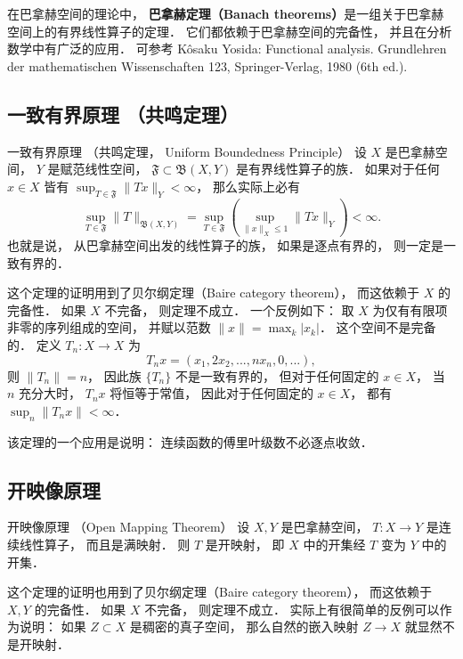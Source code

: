 

在巴拿赫空间的理论中， \textbf{巴拿赫定理（Banach theorems）}是一组关于巴拿赫空间上的有界线性算子的定理． 它们都依赖于巴拿赫空间的完备性， 并且在分析数学中有广泛的应用． 可参考 Kôsaku Yosida: Functional analysis. Grundlehren der mathematischen Wissenschaften 123, Springer-Verlag, 1980 (6th ed.).

\subsection{一致有界原理 （共鸣定理）}
\begin{theorem}{一致有界原理 （共鸣定理， Uniform Boundedness Principle）}
设 $X$ 是巴拿赫空间， $Y$ 是赋范线性空间， $\mathfrak{F}\subset\mathfrak{B}(X,Y)$ 是有界线性算子的族． 如果对于任何 $x\in X$ 皆有 $\sup_{T\in\mathfrak{F}}\|Tx\|_Y<\infty$， 那么实际上必有
$$
\sup_{T\in\mathfrak{F}}\|T\|_{\mathfrak{B}(X,Y)}
=\sup_{T\in\mathfrak{F}}\left(\sup_{\|x\|_X\leq 1}\|Tx\|_Y\right)<\infty.
$$
也就是说， 从巴拿赫空间出发的线性算子的族， 如果是逐点有界的， 则一定是一致有界的． 
\end{theorem}
这个定理的证明用到了贝尔纲定理（Baire category theorem）， 而这依赖于 $X$ 的完备性． 如果 $X$ 不完备， 则定理不成立． 一个反例如下： 取 $X$ 为仅有有限项非零的序列组成的空间， 并赋以范数 $\|x\|=\max_{k}|x_k|$． 这个空间不是完备的． 定义 $T_n:X\to X$ 为
$$
T_nx=(x_1,2x_2,...,nx_n,0,...),
$$
则 $\|T_n\|=n$， 因此族 $\{T_n\}$ 不是一致有界的， 但对于任何固定的 $x\in X$， 当 $n$ 充分大时， $T_nx$ 将恒等于常值， 因此对于任何固定的 $x\in X$， 都有 $\sup_n\|T_nx\|<\infty$．

该定理的一个应用是说明： 连续函数的傅里叶级数不必逐点收敛． 

\subsection{开映像原理}
\begin{theorem}{开映像原理 （Open Mapping Theorem）}
设 $X,Y$ 是巴拿赫空间， $T:X\to Y$ 是连续线性算子， 而且是满映射． 则 $T$ 是开映射， 即 $X$ 中的开集经 $T$ 变为 $Y$ 中的开集．
\end{theorem}

这个定理的证明也用到了贝尔纲定理（Baire category theorem）， 而这依赖于 $X,Y$ 的完备性． 如果 $X$ 不完备， 则定理不成立． 实际上有很简单的反例可以作为说明： 如果 $Z\subset X$ 是稠密的真子空间， 那么自然的嵌入映射 $Z\to X$ 就显然不是开映射．

